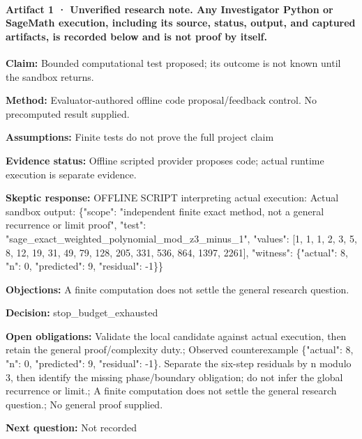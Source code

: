 \documentclass[11pt]{article}
\begin{document}
\paragraph{Artifact 1 · Unverified research note. Any Investigator Python or SageMath execution, including its source, status, output, and captured artifacts, is recorded below and is not proof by itself.}
\textbf{Claim:} Bounded computational test proposed; its outcome is not known until the sandbox returns.\par
\textbf{Method:} Evaluator-authored offline code proposal/feedback control. No precomputed result supplied.\par
\textbf{Assumptions:} Finite tests do not prove the full project claim\par
\textbf{Evidence status:} Offline scripted provider proposes code; actual runtime execution is separate evidence.\par
\textbf{Skeptic response:} OFFLINE SCRIPT interpreting actual execution: Actual sandbox output: \{"scope": "independent finite exact method, not a general recurrence or limit proof", "test": "sage\_exact\_weighted\_polynomial\_mod\_z3\_minus\_1", "values": [1, 1, 1, 2, 3, 5, 8, 12, 19, 31, 49, 79, 128, 205, 331, 536, 864, 1397, 2261], "witness": \{"actual": 8, "n": 0, "predicted": 9, "residual": -1\}\}\par
\textbf{Objections:} A finite computation does not settle the general research question.\par
\textbf{Decision:} stop\_budget\_exhausted\par
\textbf{Open obligations:} Validate the local candidate against actual execution, then retain the general proof/complexity duty.; Observed counterexample \{"actual": 8, "n": 0, "predicted": 9, "residual": -1\}. Separate the six-step residuals by n modulo 3, then identify the missing phase/boundary obligation; do not infer the global recurrence or limit.; A finite computation does not settle the general research question.; No general proof supplied.\par
\textbf{Next question:} Not recorded\par
\end{document}
